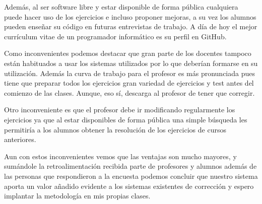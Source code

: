 Además, al ser software libre y estar disponible de forma pública cualquiera puede hacer uso de los ejercicios e incluso proponer mejoras, a su vez los alumnos pueden enseñar su código en futuras entrevistas de trabajo. A día de hoy el mejor currículum vitae de un programador informático es su perfil en GitHub.

Como inconvenientes podemos destacar que gran parte de los docentes tampoco están habituados a usar los sistemas utilizados por lo que deberían formarse en su utilización. Además la curva de trabajo para el profesor es más pronunciada pues tiene que preparar todos los ejercicios  gran variedad de ejercicios y test antes del comienzo de las clases. Aunque, eso sí, descarga al profesor de tener que corregir.

Otro inconveniente es que el profesor debe ir modificando regularmente los ejercicios ya que al estar disponibles de forma pública una simple búsqueda les permitiría a los alumnos obtener la resolución de los ejercicios de cursos anteriores.

Aun con estos inconvenientes vemos que las ventajas son mucho mayores, y sumándole la retroalimentación recibida parte de profesores y alumnos además de las personas que respondieron a la encuesta podemos concluir que nuestro sistema aporta un valor añadido evidente a los sistemas existentes de corrección y espero implantar la metodología en mis propias clases.
